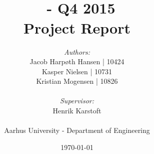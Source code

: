 \documentclass[11pt]{report}
\title{
	{\Huge \courseTitle \\}
	\bigskip
	\courseCode\ - Q4 2015 \\
	\medskip
	Project Report
	}
\author{
	\emph{Authors:}\\
	Jacob Harpøth Hansen | 10424\\
	Kasper Nielsen | 10731\\
	Kristian Mogensen | 10826\\
	\-\\
	\emph{Supervisor:}\\
	Henrik Karstoft\\
	\-\\
	Aarhus University - Department of Engineering}
\date{\today} %
\begin{document}
\maketitle	%
\listoffixmes %

\newpage			%
\tableofcontents	%

\newpage
 

\newpage
 

\newpage
 

\newpage
 

\newpage
 

\newpage
% 



% 
\end{document}
